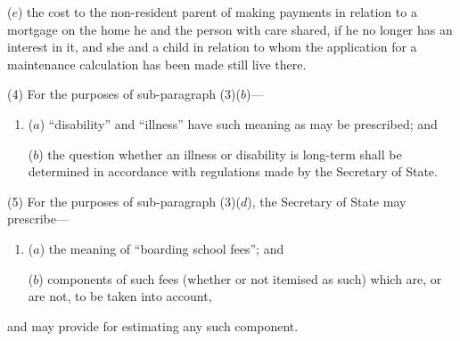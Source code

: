 \documentclass[12pt,a4paper]{article}
\begin{document}
{\begin{enumerate}
($e$) the cost to the non-resident parent of making payments in relation to a mortgage on the home he and the person with care shared, if he no longer has an interest in it, and she and a child in relation to whom the application for a maintenance calculation has been made still live there.
\end{enumerate}

(4) For the purposes of sub-paragraph (3)($b$)---
\begin{enumerate}\item[]
($a$) “disability” and “illness” have such meaning as may be prescribed; and

($b$) the question whether an illness or disability is long-term shall be determined in accordance with regulations made by the Secretary of State.
\end{enumerate}

(5) For the purposes of sub-paragraph (3)($d$), the Secretary of State may prescribe---
\begin{enumerate}\item[]
($a$) the meaning of “boarding school fees”; and

($b$) components of such fees (whether or not itemised as such) which are, or are not, to be taken into account,
\end{enumerate}
and may provide for estimating any such component.

}
\end{document}
